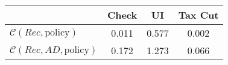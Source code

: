 \begin{tabular}{@{}lccc@{}}
\toprule
                          & Check      & UI    & Tax Cut    \\  \midrule
$\mathcal{C}(Rec,\text{policy})$ & 0.011  & 0.577  & 0.002     \\
$\mathcal{C}(Rec, AD,\text{policy})$ & 0.172  & 1.273  & 0.066     \\
\end{tabular}
